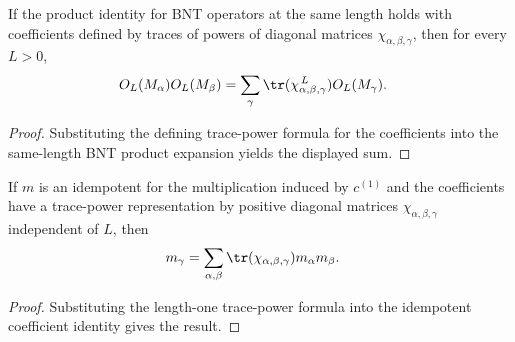 \begin{lemma}%
    \label{thm:mpdo_bnt_label_same_length_product_eq_sum_of_chi_trace_pow}
    \leanok
    If the product identity for BNT operators at the same length holds with
    coefficients defined by traces of powers of diagonal matrices
    $\chi_{\alpha,\beta,\gamma}$, then for every $L>0$,
    \begin{align}
        O_L(M_\alpha)O_L(M_\beta)
         & =
        \sum_\gamma
        \tr(\chi_{\alpha,\beta,\gamma}^{\,L})
        O_L(M_\gamma).
        \notag
    \end{align}
\end{lemma}
\begin{proof}\leanok
    Substituting the defining trace-power formula for the coefficients into the
    same-length BNT product expansion yields the displayed sum.
\end{proof}

\begin{lemma}%
    \label{thm:mpdo_bnt_label_idempotent_eq_sum_chi_trace}
    \leanok
    If $m$ is an idempotent for the multiplication induced by $c^{(1)}$ and
    the coefficients have a trace-power representation by positive diagonal
    matrices $\chi_{\alpha,\beta,\gamma}$ independent of $L$, then
    \begin{align}
        m_\gamma
         & =
        \sum_{\alpha,\beta}
        \tr(\chi_{\alpha,\beta,\gamma})
        m_\alpha m_\beta.
        \notag
    \end{align}
\end{lemma}
\begin{proof}\leanok
    Substituting the length-one trace-power formula into the idempotent
    coefficient identity gives the result.
\end{proof}

